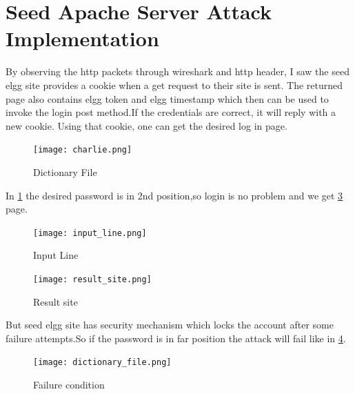 \documentclass[11pt, english]{article}
\begin{document}
\section{Seed Apache Server Attack Implementation}
By observing the http packets through wireshark and http header, I saw the seed elgg site provides a cookie when a get request to their site is sent. The returned page also contains elgg token and elgg timestamp which then can be used to invoke the login post method.If the credentials are correct, it will reply with a new cookie. Using that cookie, one can get the desired log in page.\\
\begin{figure}[h!]
        \begin{minipage}[b]{1\linewidth}
        \centering
        \texttt{[image: charlie.png]} \label{dic_file}
        \caption{Dictionary File}
        \end{minipage}
\end{figure}
In \ref{dic_file} the desired password is in 2nd position,so login is no problem and we get \ref{result_site} page.\\
\newpage
\begin{figure}[h!]
        \begin{minipage}[b]{1\linewidth}
        \centering
        \texttt{[image: input\_line.png]} \label{seed_dashboard}
        \caption{Input Line}
        \end{minipage}
\end{figure}
\begin{figure}[h!]
        \begin{minipage}[b]{1\linewidth}
        \centering
        \texttt{[image: result\_site.png]} \label{result_site}
        \caption{Result site}
        \end{minipage}
\end{figure}
But seed elgg site has security mechanism which locks the account after some failure attempts.So if the password is in far position the attack will fail like in \ref{fail}.\\
\begin{figure}[h!]
        \begin{minipage}[b]{1\linewidth}
        \centering
        \texttt{[image: dictionary\_file.png]} \label{fail}
        \caption{Failure condition}
        \end{minipage}
\end{figure}
\end{document}
